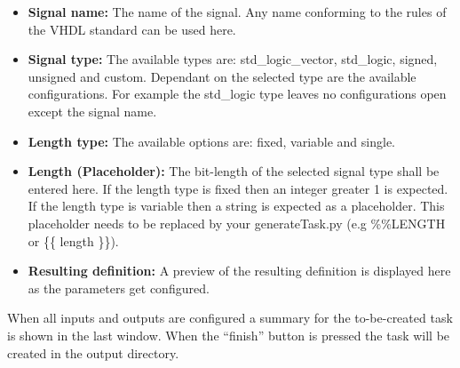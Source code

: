 \begin{itemize}
\item {\bf Signal name:} The name of the signal. Any name conforming to the rules of the VHDL standard can be used here.
\item {\bf Signal type:} The available types are: std\_logic\_vector, std\_logic, signed, unsigned and custom. Dependant on the selected type are the available configurations. For example the std\_logic type leaves no configurations open except the signal name.
\item {\bf Length type:} The available options are: fixed, variable and single.
\item {\bf Length (Placeholder):} The bit-length of the selected signal type shall be entered here. If the length type is fixed then an integer greater 1 is expected. If the length type is variable then a string is expected as a placeholder. This placeholder needs to be replaced by your generateTask.py (e.g \%\%LENGTH or \{\{ length \}\}). 
\item {\bf Resulting definition:} A preview of the resulting definition is displayed here as the parameters get configured.
\end{itemize}

When all inputs and outputs are configured a summary for the to-be-created task is shown in the last window. When the ``finish'' button is pressed the task will be created in the output directory.

